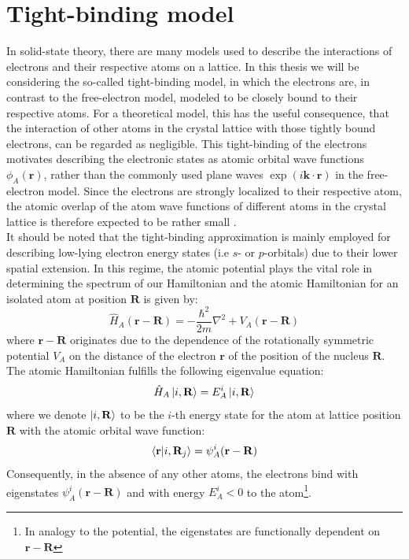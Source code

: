 \documentclass[11pt, a4paper, oneside]{book}
\theoremstyle{definition} %
\begin{document}
\section{Tight-binding model}
In solid-state theory, there are many models used to describe the interactions of electrons and their respective atoms on a lattice. In this thesis we will be considering the so-called tight-binding model, in which the electrons are, in contrast to the free-electron model, modeled to be closely bound to their respective atoms. For a theoretical model, this has the useful consequence, that the interaction of other atoms in the crystal lattice with those tightly bound electrons, can be regarded as negligible.  This tight-binding of the electrons motivates describing the electronic states as atomic orbital wave functions $\phi_A(\mathbf{r})$, rather than the commonly used plane waves $\exp(i \mathbf{k} \cdot \mathbf{r})$ in the free-electron model. Since the electrons are strongly localized to their respective atom, the atomic overlap of the atom wave functions of different atoms in the crystal lattice is therefore expected to be rather small \cite{Titus,Manfred}. \\

%
It should be noted that the tight-binding approximation is mainly employed for describing low-lying electron energy states (i.e $s$- or $p$-orbitals) due to their lower spatial extension. In this regime, the  atomic potential plays the vital role in determining the spectrum of our Hamiltonian and the atomic Hamiltonian for an isolated atom at position $\mathbf{R}$ is given by:
\begin{equation}
	\hat{H}_A(\mathbf{r} - \mathbf{R}) = -\frac{\hbar^2}{2m}\nabla^2 + V_A(\mathbf{r} - \mathbf{R})
	\label{eq:single_atomic_potential}
\end{equation}
where $\mathbf{r} - \mathbf{R}$ originates due to the dependence of the rotationally symmetric potential $V_A$ on the distance of the electron $\mathbf{r}$ of the position of the nucleus $\mathbf{R}$. The atomic Hamiltonian fulfills the following eigenvalue equation:
\begin{equation}
	\hat{H}_A \ket{i, \mathbf{R}} = E_A^i \ket{i, \mathbf{R}}
\end{equation}
where we denote $\ket{i, \mathbf{R}}$ to be the $i$-th energy state for the atom at lattice position $\mathbf{R}$ with the atomic orbital wave function:
\begin{equation}
	\braket{\mathbf{r}}{i, \mathbf{R}_j} = \psi_A^i(\mathbf{r} - \mathbf{R})
\end{equation}
Consequently, in the absence of any other atoms, the electrons bind with eigenstates $\psi_A^i(\mathbf{r} - \mathbf{R})$ and with energy $E_A^i < 0$ to the atom\footnote{In analogy to the potential, the eigenstates are functionally dependent on $\mathbf{r} - \mathbf{R}$}. \\
\end{document}

